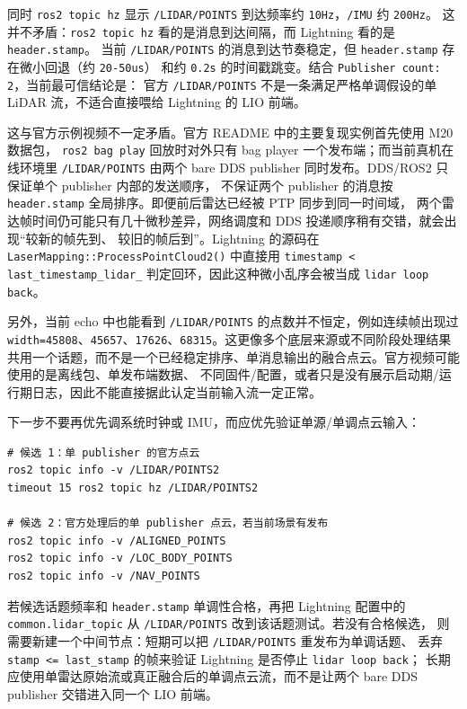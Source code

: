 \documentclass[UTF8,11pt,a4paper]{ctexart}
\begin{document}
同时 \texttt{ros2 topic hz} 显示 \texttt{/LIDAR/POINTS} 到达频率约 \texttt{10Hz}，\texttt{/IMU} 约 \texttt{200Hz}。
这并不矛盾：\texttt{ros2 topic hz} 看的是消息到达间隔，而 Lightning 看的是 \texttt{header.stamp}。
当前 \texttt{/LIDAR/POINTS} 的消息到达节奏稳定，但 \texttt{header.stamp} 存在微小回退（约 \texttt{20-50us}）
和约 \texttt{0.2s} 的时间戳跳变。结合 \texttt{Publisher count: 2}，当前最可信结论是：
官方 \texttt{/LIDAR/POINTS} 不是一条满足严格单调假设的单 LiDAR 流，不适合直接喂给 Lightning 的 LIO 前端。

这与官方示例视频不一定矛盾。官方 README 中的主要复现实例首先使用 M20 数据包，
\texttt{ros2 bag play} 回放时对外只有 bag player 一个发布端；而当前真机在线环境里
\texttt{/LIDAR/POINTS} 由两个 bare DDS publisher 同时发布。DDS/ROS2 只保证单个 publisher 内部的发送顺序，
不保证两个 publisher 的消息按 \texttt{header.stamp} 全局排序。即便前后雷达已经被 PTP 同步到同一时间域，
两个雷达帧时间仍可能只有几十微秒差异，网络调度和 DDS 投递顺序稍有交错，就会出现“较新的帧先到、
较旧的帧后到”。Lightning 的源码在 \texttt{LaserMapping::ProcessPointCloud2()} 中直接用
\texttt{timestamp < last\_timestamp\_lidar\_} 判定回环，因此这种微小乱序会被当成
\texttt{lidar loop back}。

另外，当前 echo 中也能看到 \texttt{/LIDAR/POINTS} 的点数并不恒定，例如连续帧出现过
\texttt{width=45808}、\texttt{45657}、\texttt{17626}、\texttt{68315}。这更像多个底层来源或不同阶段处理结果
共用一个话题，而不是一个已经稳定排序、单消息输出的融合点云。官方视频可能使用的是离线包、单发布端数据、
不同固件/配置，或者只是没有展示启动期/运行期日志，因此不能直接据此认定当前输入流一定正常。

下一步不要再优先调系统时钟或 IMU，而应优先验证单源/单调点云输入：

\begin{verbatim}
# 候选 1：单 publisher 的官方点云
ros2 topic info -v /LIDAR/POINTS2
timeout 15 ros2 topic hz /LIDAR/POINTS2

# 候选 2：官方处理后的单 publisher 点云，若当前场景有发布
ros2 topic info -v /ALIGNED_POINTS
ros2 topic info -v /LOC_BODY_POINTS
ros2 topic info -v /NAV_POINTS
\end{verbatim}

若候选话题频率和 \texttt{header.stamp} 单调性合格，再把 Lightning 配置中的
\texttt{common.lidar\_topic} 从 \texttt{/LIDAR/POINTS} 改到该话题测试。若没有合格候选，
则需要新建一个中间节点：短期可以把 \texttt{/LIDAR/POINTS} 重发布为单调话题、
丢弃 \texttt{stamp <= last\_stamp} 的帧来验证 Lightning 是否停止 \texttt{lidar loop back}；
长期应使用单雷达原始流或真正融合后的单调点云流，而不是让两个 bare DDS publisher 交错进入同一个 LIO 前端。
\end{document}
